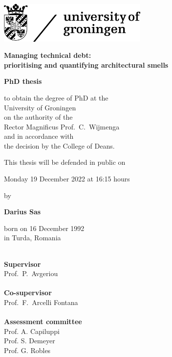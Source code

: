\pagestyle{empty}
\thispagestyle{empty}
\large
\vspace*{-3cm}

\hspace*{-0.5cm}\includegraphics[width=7.38cm]{Figures/rugr_logoen_zwart_rgb.jpg}

\begin{center}

\vspace{1cm}

{\fontsize{25pt}{30pt}\selectfont \textbf{Managing technical debt:}\\\textbf{prioritising and quantifying architectural smells}}


\vspace{2.5cm}

\textbf{\Large{PhD thesis}}

\vspace{1.6cm}

to obtain the degree of PhD at the\\
University of Groningen\\
on the authority of the\\
Rector Magnificus Prof.\ C.~Wijmenga\\
and in accordance with\\
the decision by the College of Deans.

\vspace{0.4cm}

This thesis will be defended in public on

\vspace{0.4cm}

Monday 19 December 2022 at 16:15 hours

\vspace{1cm}

by

\vspace{1cm}

\textbf{\Large{Darius Sas}}\\

\vspace{0.4cm}

born on 16 December 1992\\
in Turda, Romania
\end{center}
\enlargethispage{\baselineskip}

\restoregeometry
\clearpage
\thispagestyle{empty}
\noindent
\\
\textbf{Supervisor}\\
Prof.\ P.\ Avgeriou\\

\noindent
\\
\textbf{Co-supervisor}\\
Prof.\ F.\ Arcelli Fontana\\

\noindent
\\
\textbf{Assessment committee}\\
Prof. A. Capiluppi\\
Prof. S. Demeyer\\
Prof. G. Robles\\

\vfill
\normalsize
